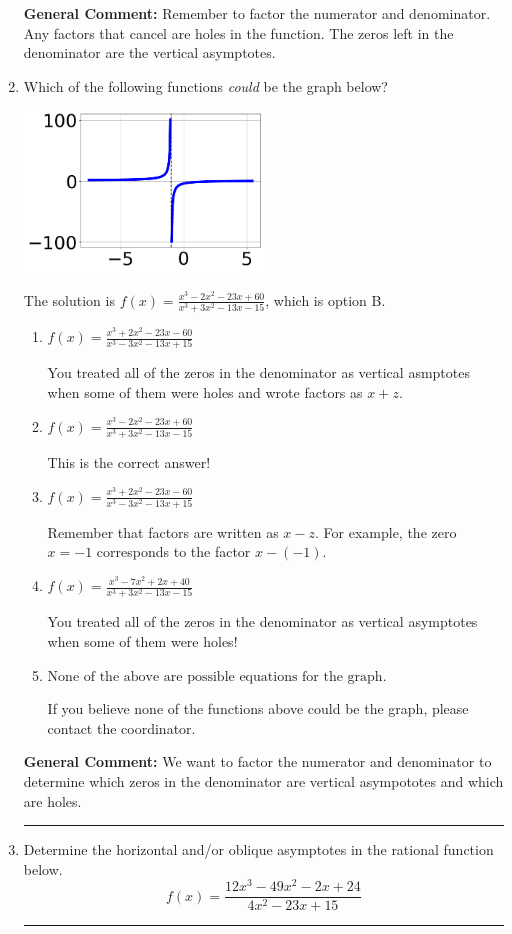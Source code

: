 \documentclass{extbook}[14pt]
\newcommand{\litem}[1]{\item #1

\rule{\textwidth}{0.4pt}}
\begin{document}
\begin{enumerate}
{\textbf{General Comment:} Remember to factor the numerator and denominator. Any factors that cancel are holes in the function. The zeros left in the denominator are the vertical asymptotes.
}
\litem{
Which of the following functions \textit{could} be the graph below?

\begin{center}
    \includegraphics[width=0.5\textwidth]{../Figures/identifyGraphOfRationalFunctionCopyB.png}
\end{center}




The solution is \( f(x)=\frac{x^{3} -2 x^{2} -23 x + 60}{x^{3} +3 x^{2} -13 x -15} \), which is option B.\begin{enumerate}[label=\Alph*.]
\item \( f(x)=\frac{x^{3} +2 x^{2} -23 x -60}{x^{3} -3 x^{2} -13 x + 15} \)

You treated all of the zeros in the denominator as vertical asmptotes when some of them were holes and wrote factors as $x+z$.
\item \( f(x)=\frac{x^{3} -2 x^{2} -23 x + 60}{x^{3} +3 x^{2} -13 x -15} \)

This is the correct answer!
\item \( f(x)=\frac{x^{3} +2 x^{2} -23 x -60}{x^{3} -3 x^{2} -13 x + 15} \)

Remember that factors are written as $x-z$. For example, the zero $x=-1$ corresponds to the factor $x-(-1)$.
\item \( f(x)=\frac{x^{3} -7 x^{2} +2 x + 40}{x^{3} +3 x^{2} -13 x -15} \)

You treated all of the zeros in the denominator as vertical asymptotes when some of them were holes!
\item \( \text{None of the above are possible equations for the graph.} \)

If you believe none of the functions above could be the graph, please contact the coordinator.
\end{enumerate}

\textbf{General Comment:} We want to factor the numerator and denominator to determine which zeros in the denominator are vertical asympototes and which are holes.
}
\litem{
Determine the horizontal and/or oblique asymptotes in the rational function below.
\[ f(x) = \frac{12x^{3} -49 x^{2} -2 x + 24}{4x^{2} -23 x + 15} \]

}
\end{enumerate}
\end{document}
